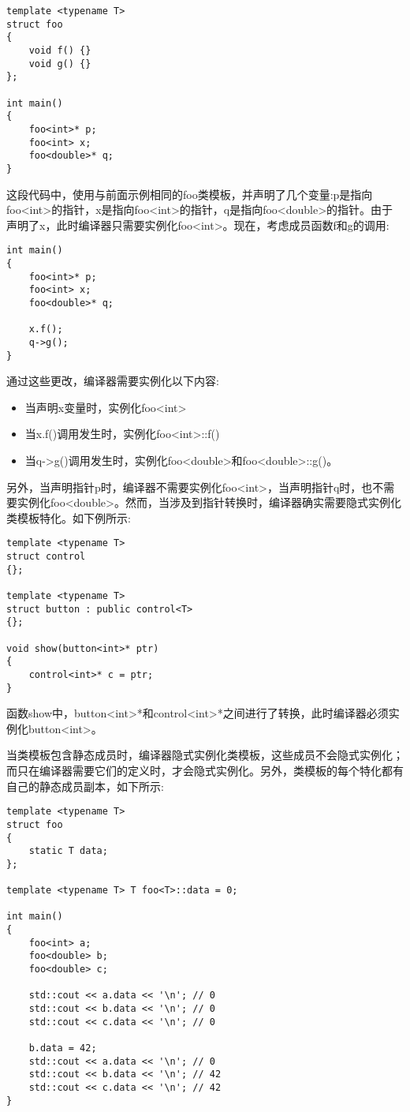 \begin{lstlisting}[style=styleCXX]
template <typename T>
struct foo
{
	void f() {}
	void g() {}
};

int main()
{
	foo<int>* p;
	foo<int> x;
	foo<double>* q;
}
\end{lstlisting}

这段代码中，使用与前面示例相同的foo类模板，并声明了几个变量:p是指向foo<int>的指针，x是指向foo<int>的指针，q是指向foo<double>的指针。由于声明了x，此时编译器只需要实例化foo<int>。现在，考虑成员函数f和g的调用:

\begin{lstlisting}[style=styleCXX]
int main()
{
	foo<int>* p;
	foo<int> x;
	foo<double>* q;
	
	x.f();
	q->g();
}
\end{lstlisting}

通过这些更改，编译器需要实例化以下内容:

\begin{itemize}
\item 
当声明x变量时，实例化foo<int>

\item 
当x.f()调用发生时，实例化foo<int>::f()

\item 
当q->g()调用发生时，实例化foo<double>和foo<double>::g()。
\end{itemize}

另外，当声明指针p时，编译器不需要实例化foo<int>，当声明指针q时，也不需要实例化foo<double>。然而，当涉及到指针转换时，编译器确实需要隐式实例化类模板特化。如下例所示:

\begin{lstlisting}[style=styleCXX]
template <typename T>
struct control
{};

template <typename T>
struct button : public control<T>
{};

void show(button<int>* ptr)
{
	control<int>* c = ptr;
}
\end{lstlisting}

函数show中，button<int>*和control<int>*之间进行了转换，此时编译器必须实例化button<int>。

当类模板包含静态成员时，编译器隐式实例化类模板，这些成员不会隐式实例化；而只在编译器需要它们的定义时，才会隐式实例化。另外，类模板的每个特化都有自己的静态成员副本，如下所示:

\begin{lstlisting}[style=styleCXX]
template <typename T>
struct foo
{
	static T data;
};

template <typename T> T foo<T>::data = 0;

int main()
{
	foo<int> a;
	foo<double> b;
	foo<double> c;
	
	std::cout << a.data << '\n'; // 0
	std::cout << b.data << '\n'; // 0
	std::cout << c.data << '\n'; // 0
	
	b.data = 42;
	std::cout << a.data << '\n'; // 0
	std::cout << b.data << '\n'; // 42
	std::cout << c.data << '\n'; // 42
}
\end{lstlisting}

